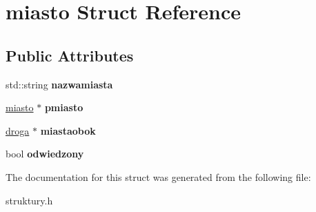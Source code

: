 \hypertarget{structmiasto}{}\section{miasto Struct Reference}
\label{structmiasto}
\subsection*{Public Attributes}
\begin{DoxyCompactItemize}
\item 
\mbox{\label{structmiasto_a75a023beb08b889860c2068ffd47318e}} 
std\+::string {\bfseries nazwamiasta}
\item 
\mbox{\label{structmiasto_a9cd7b8d4e3e00ba833d3149b76a918f9}} 
\mbox{\hyperlink{structmiasto}{miasto}} $\ast$ {\bfseries pmiasto}
\item 
\mbox{\label{structmiasto_af69437beea5c134e233947df273a48a4}} 
\mbox{\hyperlink{structdroga}{droga}} $\ast$ {\bfseries miastaobok}
\item 
\mbox{\label{structmiasto_a7a2028174edb36e184c06d084d02ef27}} 
bool {\bfseries odwiedzony}
\end{DoxyCompactItemize}


The documentation for this struct was generated from the following file\+:\begin{DoxyCompactItemize}
\item 
struktury.\+h\end{DoxyCompactItemize}
